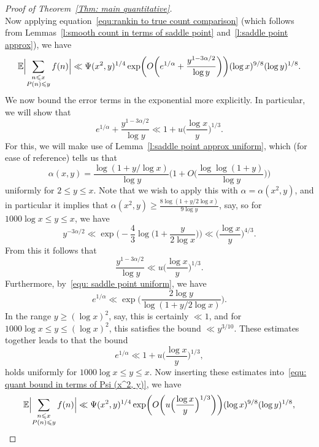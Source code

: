\documentclass[10pt,a4paper]{amsart}
\def\E{\mathbb E}
\def\leq {\leqslant}
\begin{document}
\begin{proof}[Proof of Theorem~\ref{Thm: main quantitative}]
\[\]
Now applying equation~\eqref{equ:rankin to true count comparison} (which follows from Lemmas~\ref{l:smooth count in terms of saddle point} and~\ref{l:saddle point approx}), we have
\begin{equation}\label{equ: quant bound in terms of Psi (x^2, y)}
\E \Bigl| \sum_{\substack{n \leq x \\ P(n) \leq y}} f(n) \Bigr| \ll \Psi(x^2, y)^{1/4} \exp \biggl( O \biggl( e^{1/\alpha} + \frac{y^{1 - 3 \alpha / 2}}{\log y} \biggr) \biggr) (\log x)^{9/8} (\log y)^{1/8}.
\end{equation}
We now bound the error terms in the exponential more explicitly. In particular, we will show that
\[
e^{1/\alpha} + \frac{y^{1 - 3 \alpha / 2}}{\log y} \ll 1 + u \biggl( \frac{\log x}{y} \biggr)^{1/3}. 
\]
For this, we will make use of Lemma~\ref{l:saddle point approx uniform}, which (for ease of reference) tells us that
\begin{equation}\label{equ: saddle point uniform}
\alpha (x,y) = \frac{\log (1 + y/\log x)}{\log y} \biggl( 1 + O \biggl( \frac{\log \log (1+y)}{\log y} \biggr) \biggr)
\end{equation}
uniformly for $2 \leq y \leq x$. Note that we wish to apply this with $\alpha = \alpha(x^2,y)$, and in particular it implies that $\alpha (x^2, y) \geq \frac{8 \log (1 + y / 2 \log x)}{9 \log y}$, say, so for $1000 \log x \leq y \leq x$, we have
\[
y^{-3\alpha / 2} \ll \exp \biggl( - \frac{4}{3} \log \biggl(1 + \frac{y}{2\log x}\biggr) \biggr) \ll \biggl( \frac{\log x}{y} \biggr)^{4/3}.
\]
From this it follows that
\[
\frac{y^{1 - 3 \alpha / 2}}{\log y} \ll u \biggl( \frac{\log x}{y} \biggr)^{1/3}.
\]
Furthermore, by~\eqref{equ: saddle point uniform}, we have
\[
e^{1/\alpha} \ll \exp \biggl( \frac{2 \log y}{\log (1 + y/2\log x)} \biggr).
\]
In the range $y \geq (\log x)^2$, say, this is certainly $\ll 1$, and for $1000 \log x \leq y \leq (\log x)^2$, this satisfies the bound $\ll y^{3/10}$. These estimates together leads to that the bound
\[
e^{1/\alpha} \ll 1 +  u \biggl( \frac{\log x}{y} \biggr)^{1/3},
\]
holds uniformly for $1000 \log x \leq y \leq x$. Now inserting these estimates into~\eqref{equ: quant bound in terms of Psi (x^2, y)}, we have 
\begin{equation}\label{equ: L1 norm in terms of psi(x^2, y) bound}
\E \Bigl| \sum_{\substack{n \leq x \\ P(n) \leq y}} f(n) \Bigr| \ll \Psi(x^2, y)^{1/4} \exp \biggl( O \biggl( u \Bigl( \frac{\log x}{y} \Bigr)^{1/3} \biggr) \biggr) (\log x)^{9/8} (\log y)^{1/8},
\end{equation}

\end{proof}
\end{document}
